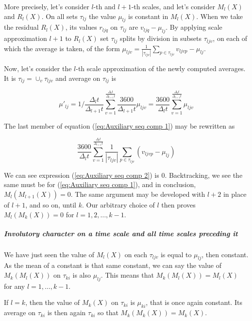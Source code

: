 \documentclass[a4paper,10pt]{book}
\begin{document}
More precisely, let's consider $l$-th and $l+1$-th scales, and let's consider $M_{l}(X)$ and $R_{l}(X)$. On all sets $\tau_{lj}$ the value $\mu_{lj}$ is constant in $M_{l}(X)$. When we take the residual $R_{l}(X)$, its values $r_{ljq}$ on $\tau_{lj}$ are $v_{ljq} - \mu_{lj}$. By applying scale approximation $l+1$ to $R_{l}(X)$ set $\tau_{lj}$ splits by division in subsets $\tau_{ljv}$, on each of which the average is taken, of the form $\mu_{ljv} = \frac{1}{|\tau_{ljv}|}\sum_{p \in \tau_{ljv}} v_{ljvp} - \mu_{lj}$.

Now, let's consider the $l$-th scale approximation of the newly computed averages. It is $\tau_{lj} = \cup_{v} \tau_{ljv}$ and average on $\tau_{lj}$ is

\begin{equation}\label{eq:Auxiliary seq comp 1}
	\mu'_{lj} = 1/\frac{\Delta_{l} t}{\Delta_{l+1} t}\sum_{v=1}^{\frac{\Delta_{l} t}{\Delta_{l+1} t}} \frac{3600}{\Delta_{l+1} t} \mu_{ljv} =
	\frac{3600}{\Delta_{l} t} \sum_{v=1}^{\frac{\Delta_{l} t}{\Delta_{l+1} t}} \mu_{ljv}
\end{equation}

\noindent The last member of equation (\ref{eq:Auxiliary seq comp 1}) may be rewritten as

\begin{equation}\label{eq:Auxiliary seq comp 2}
	\frac{3600}{\Delta_{l} t} \sum_{v=1}^{\frac{\Delta_{l} t}{\Delta_{l+1} t}} \frac{1}{|\tau_{ljv}|}\sum_{p \in \tau_{ljv}} \left(v_{ljvp} - \mu_{lj}\right)
\end{equation}

We can see expression (\ref{eq:Auxiliary seq comp 2}) is 0. Backtracking, we see the same must be for (\ref{eq:Auxiliary seq comp 1}), and in conclusion, $M_{l}(M_{l+1}(X)) = 0$. The same argument may be developed with $l+2$ in place of $l+1$, and so on, until $k$. Our arbitrary choice of $l$ then proves $M_{l}(M_{k}(X)) = 0$ for $l=1, 2, \ldots, k-1$.


\subparagraph{Involutory character on a time scale and all time scales preceding it}

We have just seen the value of $M_{l}(X)$ on each $\tau_{ljv}$ is equal to $\mu_{lj}$, then constant. As the mean of a constant is that same constant, we can say the value of $M_{k}(M_{l}(X))$ on $\tau_{ki}$ is also $\mu_{lj}$. This means that $M_{k}(M_{l}(X)) = M_{l}(X)$ for any $l = 1, \ldots, k-1$.

If $l = k$, then the value of $M_{k}(X)$ on $\tau_{ki}$ is $\mu_{ki}$, that is once again constant. Its average on $\tau_{ki}$ is then again $\tau_{ki}$ so that $M_{k}(M_{k}(X)) = M_{k}(X)$.
\end{document}

